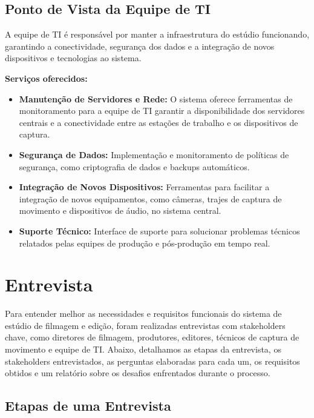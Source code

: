 \subsection{Ponto de Vista da Equipe de TI}

A equipe de TI é responsável por manter a infraestrutura do estúdio funcionando, garantindo a conectividade, segurança dos dados e a integração de novos dispositivos e tecnologias ao sistema.

\textbf{Serviços oferecidos:}
\begin{itemize}
  \item \textbf{Manutenção de Servidores e Rede:} O sistema oferece ferramentas de monitoramento para a equipe de TI garantir a disponibilidade dos servidores centrais e a conectividade entre as estações de trabalho e os dispositivos de captura.
  \item \textbf{Segurança de Dados:} Implementação e monitoramento de políticas de segurança, como criptografia de dados e backups automáticos.
  \item \textbf{Integração de Novos Dispositivos:} Ferramentas para facilitar a integração de novos equipamentos, como câmeras, trajes de captura de movimento e dispositivos de áudio, no sistema central.
  \item \textbf{Suporte Técnico:} Interface de suporte para solucionar problemas técnicos relatados pelas equipes de produção e pós-produção em tempo real.
\end{itemize}








\newpage
\section{Entrevista}

Para entender melhor as necessidades e requisitos funcionais do sistema de estúdio de filmagem e edição, foram realizadas entrevistas com stakeholders chave, como diretores de filmagem, produtores, editores, técnicos de captura de movimento e equipe de TI. Abaixo, detalhamos as etapas da entrevista, os stakeholders entrevistados, as perguntas elaboradas para cada um, os requisitos obtidos e um relatório sobre os desafios enfrentados durante o processo.

\subsection{Etapas de uma Entrevista}

